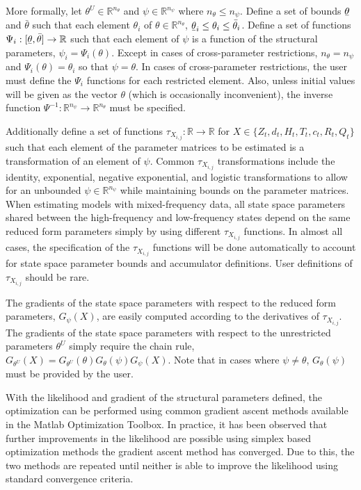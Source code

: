 \documentclass[12pt]{article}
\newcommand{\Gt}{G_\theta}
\newcommand{\ubar}[1]{\text{\b{$#1$}}}
\begin{document}
	More formally, let $\theta^U \in \mathbb{R}^{n_\theta}$ and $\psi \in \mathbb{R}^{n_\psi}$ where $n_\theta \leq n_\psi$. Define a set of bounds $\ubar{\theta}$  and $\bar{\theta}$ such that each element $\theta_i$ of $\theta \in \mathbb{R}^{n_\theta}$, $\ubar{\theta}_i \leq \theta_i \leq \bar{\theta}_i$. 
	Define a set of functions $\Psi_i: [\ubar{\theta}, \bar{\theta}] \rightarrow \mathbb{R}$ such that each element of $\psi$ is a function of the structural parameters, $\psi_i = \Psi_i(\theta)$. Except in cases of cross-parameter restrictions, $n_\theta = n_\psi$ and $\Psi_i(\theta) = \theta_i$ so that $\psi = \theta$. In cases of cross-parameter restrictions, the user must define the $\Psi_i$ functions for each restricted element. Also, unless initial values will be given as the vector $\theta$ (which is occasionally inconvenient), the inverse function $\Psi^{-1} : \mathbb{R}^{n_\psi} \rightarrow \mathbb{R}^{n_\theta}$ must be specified.

	Additionally define a set of functions $\tau_{X_{i,j}}: \mathbb{R} \rightarrow \mathbb{R}$ for $X \in \{ Z_t, d_t, H_t, T_t, c_t, R_t, Q_t \}$ such that each element of the parameter matrices to be estimated is a transformation of an element of $\psi$. Common $\tau_{X_{i,j}}$ transformations include the identity, exponential, negative exponential, and logistic transformations to allow for an unbounded $\psi \in \mathbb{R}^{n_\psi}$ while maintaining bounds on the parameter matrices. When estimating models with mixed-frequency data, all state space parameters shared between the high-frequency and low-frequency states depend on the same reduced form parameters simply by using different $\tau_{X_{i,j}}$ functions. In almost all cases, the specification of the $\tau_{X_{i,j}}$ functions will be done automatically to account for state space parameter bounds and accumulator definitions. User definitions of $\tau_{X_{i,j}}$ should be rare. 

	The gradients of the state space parameters with respect to the reduced form parameters, $G_\psi(X)$, are  easily computed according to the derivatives of $\tau_{X_{i,j}}$. The gradients of the state space parameters with respect to the unrestricted parameters $\theta^U$ simply require the chain rule, $G_{\theta^U}(X) = G_{\theta^U}(\theta) \Gt(\psi) G_\psi(X) $. Note that in cases where $\psi \neq \theta$, $\Gt(\psi)$ must be provided by the user.

	With the likelihood and gradient of the structural parameters defined, the optimization can be performed using common gradient ascent methods available in the Matlab Optimization Toolbox. In practice, it has been observed that further improvements in the likelihood are possible using simplex based optimization methods the gradient ascent method has converged. Due to this, the two methods are repeated until neither is able to improve the likelihood using standard convergence criteria. 
\end{document}
